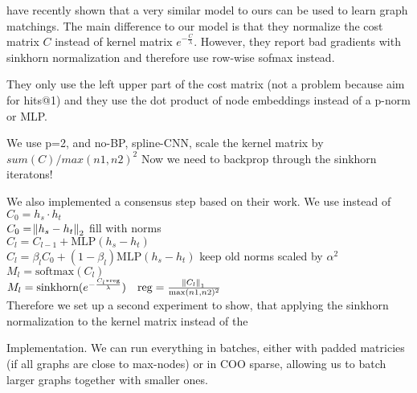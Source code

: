 \cite{fey2020_update} have recently shown that a very similar model to ours can be used to learn graph matchings. The main difference to our model is that they normalize the cost matrix $C$ instead of kernel matrix $e^{-\frac{C}{\lambda}}$. However, they report bad gradients with sinkhorn normalization and therefore use row-wise sofmax instead.


They only use the left upper part of the cost matrix (not a problem because aim for hits@1)
and they use the dot product of node embeddings instead of a p-norm or MLP.

We use p=2, and no-BP, spline-CNN, scale the kernel matrix by $sum(C) / max(n1,n2)^2$
Now we need to backprop through the sinkhorn iteratons!

We also implemented a consensus step based on their work. We use instead of
\\
$C_0 = h_s \cdot h_t$\\
$C_0 = \norm{h_s - h_t}_2$ fill with norms\\
$C_l = C_{l - 1} + \text{MLP}(h_s - h_t)$\\
$C_l = \beta_l C_0 + (1 - \beta_l) \text{MLP}(h_s - h_t)$ keep old norms scaled by $\alpha^2$\\
$M_l = \text{softmax}(C_l)$ \\
$M_l = \text{sinkhorn}(e^{-\frac{C_l * \text{reg}}{\lambda}}) \quad \text{reg} = \frac{\norm{C_l}_1}{\max(n1,n2)^2}$\\


Therefore we set up a second experiment to show, that applying the sinkhorn normalization to the kernel matrix instead of the



Implementation. We can run everything in batches, either with padded matricies (if all graphs are close to max-nodes) or in COO sparse, allowing us to batch larger graphs together with smaller ones.
